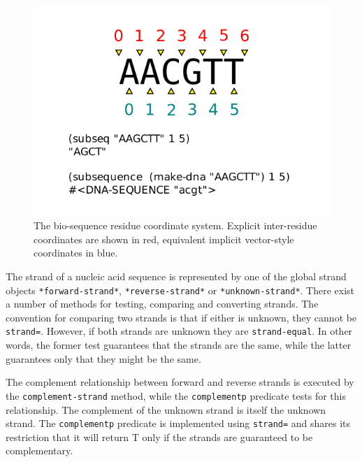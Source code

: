 \documentclass[a4paper, 12pt]{article}
\begin{document}
\begin{figure}[tbph]
  \begin{center}
    \includegraphics[scale=1.0]{inter-residue-coordinates.pdf}
  \end{center}
  \caption{The bio-sequence residue coordinate system. Explicit
    inter-residue coordinates are shown in red, equivalent implicit
    vector-style coordinates in blue.}
  \label{fig:inter-residue-coords}
\end{figure}

The strand of a nucleic acid sequence is represented by one of the
global strand objects \lstinline!*forward-strand*!,
\lstinline!*reverse-strand*! or \lstinline!*unknown-strand*!. There
exist a number of methods for testing, comparing and converting
strands. The convention for comparing two strands is that if either is
unknown, they cannot be \lstinline!strand=!. However, if both strands
are unknown they are \lstinline!strand-equal!. In other words, the
former test guarantees that the strands are the same, while the latter
guarantees only that they might be the same.

The complement relationship between forward and reverse strands is
executed by the \lstinline!complement-strand! method, while the
\lstinline!complementp! predicate tests for this relationship. The
complement of the unknown strand is itself the unknown strand. The
\lstinline!complementp! predicate is implemented using
\lstinline!strand=! and shares its restriction that it will return T
only if the strands are guaranteed to be complementary.
\end{document}
